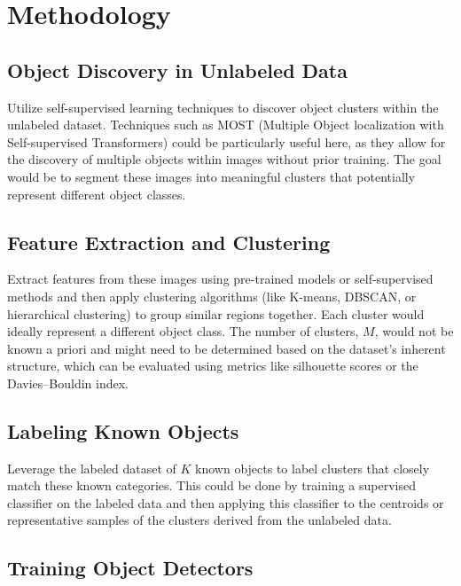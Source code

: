 \documentclass{article}
\begin{document}
	\section{Methodology}
	\label{methodology}
	
	
	
	\subsection{Object Discovery in Unlabeled Data}
	
	
	Utilize self-supervised learning techniques to discover object clusters within the unlabeled dataset. Techniques such as MOST (Multiple Object localization with Self-supervised Transformers) could be particularly useful here, as they allow for the discovery of multiple objects within images without prior training. The goal would be to segment these images into meaningful clusters that potentially represent different object classes.
	
	\subsection{Feature Extraction and Clustering} 
	
	
	Extract features from these images using pre-trained models or self-supervised methods and then apply clustering algorithms (like K-means, DBSCAN, or hierarchical clustering) to group similar regions together. Each cluster would ideally represent a different object class. The number of clusters, $M$, would not be known a priori and might need to be determined based on the dataset's inherent structure, which can be evaluated using metrics like silhouette scores or the Davies–Bouldin index.
	
	\subsection{Labeling Known Objects}
	
	
	Leverage the labeled dataset of $K$ known objects to label clusters that closely match these known categories. This could be done by training a supervised classifier on the labeled data and then applying this classifier to the centroids or representative samples of the clusters derived from the unlabeled data.
	
	\subsection{Training Object Detectors}
	
\end{document}
